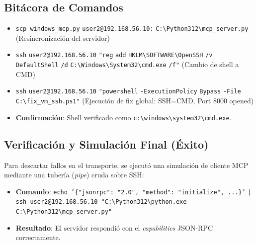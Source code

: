 \subsection*{Bitácora de Comandos}
\begin{itemize}
    \item \texttt{scp windows\_mcp.py} \newline \texttt{user2@192.168.56.10:} \newline \texttt{C:\textbackslash}\allowbreak\texttt{Python312\textbackslash}\allowbreak\texttt{mcp\_}\allowbreak\texttt{server.py} \newline (Resincronización del servidor)
    \item \texttt{ssh} \texttt{user2@192.168.56.10} \newline \texttt{"reg} \texttt{add} \texttt{HKLM\textbackslash}\allowbreak\texttt{SOFTWARE\textbackslash}\allowbreak\texttt{OpenSSH} \texttt{/v} \texttt{DefaultShell} \texttt{/d} \texttt{C:\textbackslash}\allowbreak\texttt{Windows\textbackslash}\allowbreak\texttt{System32\textbackslash}\allowbreak\texttt{cmd.exe} \texttt{/f"} \newline (Cambio de shell a CMD)
    \item \texttt{ssh} \texttt{user2@192.168.56.10} \newline \texttt{"powershell} \texttt{-Execution}\allowbreak\texttt{Policy} \texttt{Bypass} \texttt{-File} \texttt{C:\textbackslash}\allowbreak\texttt{fix\_}\allowbreak\texttt{vm\_}\allowbreak\texttt{ssh.ps1"} \newline (Ejecución de fix global: SSH=CMD, Port 8000 opened)
    \item \textbf{Confirmación}: Shell verificado como \newline \texttt{c:\textbackslash windows\textbackslash system32\textbackslash cmd.exe}.
\end{itemize}

\subsection*{Verificación y Simulación Final (Éxito)}
Para descartar fallos en el transporte, se ejecutó una simulación de cliente MCP mediante una tubería (\textit{pipe}) cruda sobre SSH:
\begin{itemize}
    \item \textbf{Comando}: \newline
    \texttt{echo '\{"jsonrpc": "2.0", "method": "initialize", ...\}'} \newline
    \texttt{| ssh user2@192.168.56.10 "C:\textbackslash Python312\textbackslash python.exe} \newline
    \texttt{  C:\textbackslash Python312\textbackslash mcp\_server.py"}
    \item \textbf{Resultado}: El servidor respondió con el \textit{capabilities} JSON-RPC correctamente.
\end{itemize}

